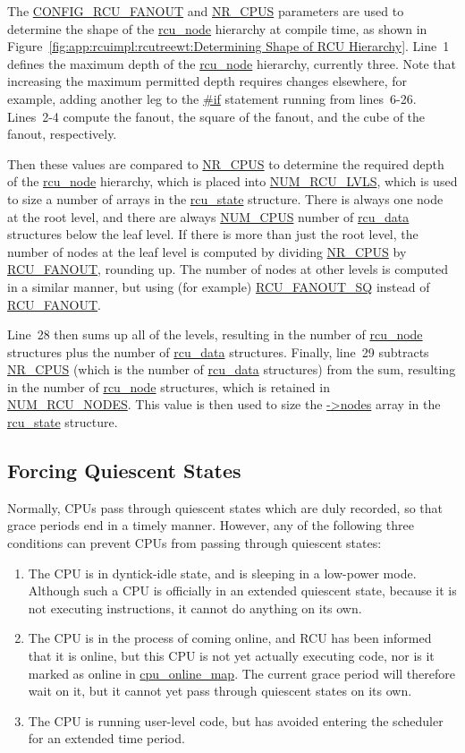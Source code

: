 The \url{CONFIG_RCU_FANOUT} and \url{NR_CPUS} parameters are used to
determine the shape of the \url{rcu_node} hierarchy at compile time,
as shown in
Figure~\ref{fig:app:rcuimpl:rcutreewt:Determining Shape of RCU Hierarchy}.
Line~1 defines the maximum depth of the \url{rcu_node} hierarchy,
currently three.
Note that increasing the maximum permitted depth requires changes
elsewhere, for example, adding another leg to the \url{#if}
statement running from lines~6-26.
Lines~2-4 compute the fanout, the square of the fanout, and the cube
of the fanout, respectively.

Then these values are compared to \url{NR_CPUS} to determine the required
depth of the \url{rcu_node} hierarchy, which is placed into
\url{NUM_RCU_LVLS}, which is used to size a number of arrays
in the \url{rcu_state} structure.
There is always one node at the root level, and there are always
\url{NUM_CPUS} number of \url{rcu_data} structures below the leaf
level.
If there is more than just the root level, the number of nodes at
the leaf level is computed
by dividing \url{NR_CPUS} by \url{RCU_FANOUT}, rounding up.
The number of nodes at other levels is computed in a similar manner,
but using (for example) \url{RCU_FANOUT_SQ} instead of \url{RCU_FANOUT}.

Line~28 then sums up all of the levels, resulting in the number of
\url{rcu_node} structures plus the number of \url{rcu_data} structures.
Finally, line~29 subtracts \url{NR_CPUS} (which is the number of
\url{rcu_data} structures) from the sum, resulting in the number
of \url{rcu_node} structures, which is retained in
\url{NUM_RCU_NODES}.
This value is then used to size the \url{->nodes} array in the
\url{rcu_state} structure.

\subsection{Forcing Quiescent States}
\label{app:rcuimpl:rcutreewt:Forcing Quiescent States}

Normally, CPUs pass through quiescent states which are duly recorded,
so that grace periods end in a timely manner.
However, any of the following three conditions can prevent CPUs from
passing through quiescent states:

\begin{enumerate}
\item	The CPU is in dyntick-idle state, and is sleeping in a low-power
	mode.
	Although such a CPU is officially in an extended quiescent state,
	because it is not executing instructions, it cannot do anything
	on its own.
\item	The CPU is in the process of coming online, and RCU has been
	informed that it is online, but this CPU is not yet actually
	executing code, nor is it marked as online in \url{cpu_online_map}.
	The current grace period will therefore wait on it, but it cannot
	yet pass through quiescent states on its own.
\item	The CPU is running user-level code, but has avoided
	entering the scheduler for an extended time period.
\end{enumerate}

